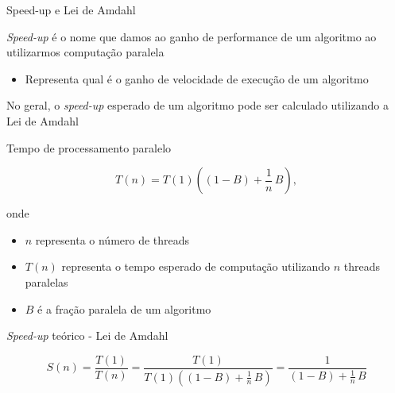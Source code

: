 \documentclass[compress]{beamer}
\begin{document}

\begin{frame}{Speed-up e Lei de Amdahl}

\textit{Speed-up} é o nome que damos ao ganho de performance de um algoritmo ao utilizarmos computação paralela
\begin{itemize}
    \item Representa qual é o ganho de velocidade de execução de um algoritmo
\end{itemize}

\vspace{0.5cm}

No geral, o \textit{speed-up} esperado de um algoritmo pode ser calculado utilizando a Lei de Amdahl

\end{frame}


\begin{frame}{Tempo de processamento paralelo}

$$
T(n) = T(1) \left( (1 - B) + \frac{1}{n}\,B \right),
$$

\vspace{1cm}
onde 
\begin{itemize}
    \item $n$ representa o número de threads
    \item $T(n)$ representa o tempo esperado de computação utilizando $n$ threads paralelas
    \item $B$ é a fração paralela de um algoritmo
\end{itemize}

\end{frame}


\begin{frame}{\textit{Speed-up} teórico - Lei de Amdahl}

$$
S(n) = \frac{T(1)}{T(n)} = \frac{T(1)}{T(1) \left( (1 - B) + \frac{1}{n}\,B
\right)} = \frac{1}{ (1 - B) + \frac{1}{n}\,B}
$$

\end{frame}

\end{document}
